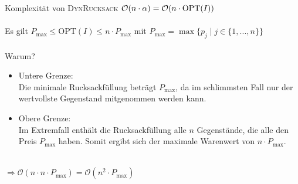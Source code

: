 \begin{frame}{Komplexität von \textsc{DynRucksack}}
    $\mathcal{O}( n \cdot \alpha) = \mathcal{O}( n \cdot \operatorname{OPT}(I))$ \\~\\
    \pause    
    Es gilt $P_{\text{max}} \leq \text{OPT}(I) \leq n \cdot P_{\text{max}}$ 
    \quad mit $P_{\text{max}}=\max\{p_j \mid j \in \{1,...,n\}\}$ \\~\\
    \pause
    Warum?
    \begin{itemize}
        \item Untere Grenze: \\ Die minimale Rucksackfüllung beträgt $P_{\text{max}}$, da im schlimmsten Fall nur der wertvollste Gegenstand mitgenommen werden kann.
        \item Obere Grenze:  \\ Im Extremfall enthält die Rucksackfüllung alle $n$ Gegenstände, die alle den Preis $P_{\text{max}}$ haben. Somit ergibt sich der maximale Warenwert von $n \cdot P_{\text{max}}$.
    \end{itemize} ~\\
    
    $\Rightarrow \mathcal{O}( n \cdot n \cdot P_{\max}) = \mathcal{O}( n^2 \cdot P_{\max})$    
\end{frame}

